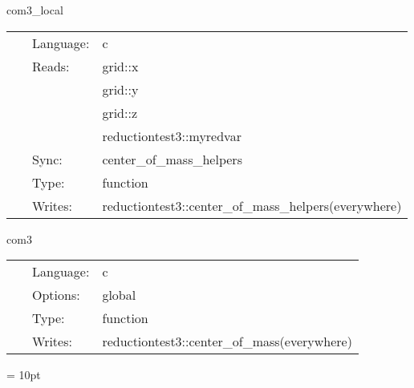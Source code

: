 
\hspace{5mm} com3\_local 

\hspace{5mm}{\it setup integrands for com calculation } 


\hspace{5mm}

 \begin{tabular*}{160mm}{cll} 
~ & Language:  & c \\ 
~ & Reads:  & grid::x \\ 
~& ~ &grid::y\\ 
~& ~ &grid::z\\ 
~& ~ &reductiontest3::myredvar\\ 
~ & Sync:  & center\_of\_mass\_helpers \\ 
~ & Type:  & function \\ 
~ & Writes:  & reductiontest3::center\_of\_mass\_helpers(everywhere) \\ 
\end{tabular*} 


\vspace{5mm}


\hspace{5mm} com3 

\hspace{5mm}{\it com reductions } 


\hspace{5mm}

 \begin{tabular*}{160mm}{cll} 
~ & Language:  & c \\ 
~ & Options:  & global \\ 
~ & Type:  & function \\ 
~ & Writes:  & reductiontest3::center\_of\_mass(everywhere) \\ 
\end{tabular*} 



\vspace{5mm}\parskip = 10pt 
